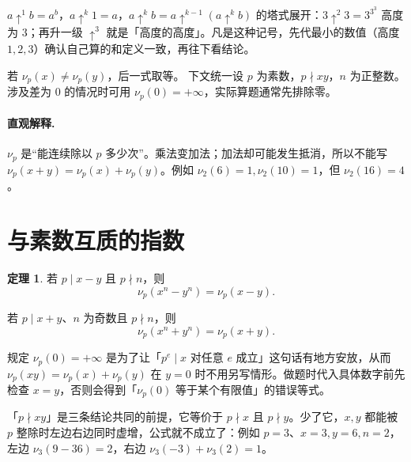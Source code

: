 \documentclass[UTF8,a4paper,11pt,twoside,openright,fontset=fandol]{ctexbook}
\theoremstyle{definition}
\newtheorem{theorem}[definition]{定理}
\begin{document}
\begin{tip}[箭号记号的两条约定]
$a\uparrow^1 b=a^b$，$a\uparrow^{k}1=a$，$a\uparrow^{k}b=a\uparrow^{k-1}(a\uparrow^{k}b)$ 的塔式展开：$3\uparrow^2 3=3^{3^3}$ 高度为 $3$；再升一级 $\uparrow^3$ 就是「高度的高度」。凡是这种记号，先代最小的数值（高度 $1,2,3$）确认自己算的和定义一致，再往下看结论。
\end{tip}

若 $\nu_p(x)\ne\nu_p(y)$，后一式取等。
下文统一设 $p$ 为素数，$p\nmid xy$，$n$ 为正整数。涉及差为 $0$ 的情况时可用 $\nu_p(0)=+\infty$，实际算题通常先排除零。


\paragraph{直观解释.} $\nu_p$ 是“能连续除以 $p$ 多少次”。乘法变加法；加法却可能发生抵消，所以不能写 $\nu_p(x+y)=\nu_p(x)+\nu_p(y)$。例如 $\nu_2(6)=1,\nu_2(10)=1$，但 $\nu_2(16)=4$。
\section{与素数互质的指数}
\begin{theorem}
若 $p\mid x-y$ 且 $p\nmid n$，则
\[
 \nu_p(x^n-y^n)=\nu_p(x-y).
\]



若 $p\mid x+y$、$n$ 为奇数且 $p\nmid n$，则
\[
 \nu_p(x^n+y^n)=\nu_p(x+y).
\]
\end{theorem}

\begin{tip}[口径：为什么规定 $\nu_p(0)=+\infty$]
规定 $\nu_p(0)=+\infty$ 是为了让「$p^e\mid x$ 对任意 $e$ 成立」这句话有地方安放，从而 $\nu_p(xy)=\nu_p(x)+\nu_p(y)$ 在 $y=0$ 时不用另写情形。做题时代入具体数字前先检查 $x=y$，否则会得到「$\nu_p(0)$ 等于某个有限值」的错误等式。
\end{tip}


\begin{tip}
「$p\nmid xy$」是三条结论共同的前提，它等价于 $p\nmid x$ 且 $p\nmid y$。少了它，$x,y$ 都能被 $p$ 整除时左边右边同时虚增，公式就不成立了：例如 $p=3$、$x=3,y=6,n=2$，左边 $\nu_3(9-36)=2$，右边 $\nu_3(-3)+\nu_3(2)=1$。
\end{tip}
\end{document}
